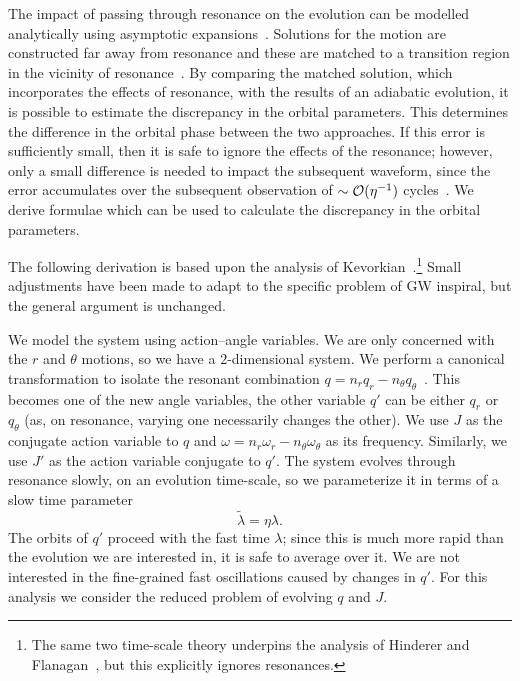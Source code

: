 
The impact of passing through resonance on the evolution can be modelled analytically using asymptotic expansions~\cite{Gair2012}. Solutions for the motion are constructed far away from resonance and these are matched to a transition region in the vicinity of resonance~\cite{Kevorkian1971,Bosley1992}. By comparing the matched solution, which incorporates the effects of resonance, with the results of an adiabatic evolution, it is possible to estimate the discrepancy in the orbital parameters. This determines the difference in the orbital phase between the two approaches. If this error is sufficiently small, then it is safe to ignore the effects of the resonance; however, only a small difference is needed to impact the subsequent waveform, since the error accumulates over the subsequent observation of $\sim \mathcal{O}({\eta^{-1}})$ cycles~\cite{Flanagan2012}. We derive formulae which can be used to calculate the discrepancy in the orbital parameters.

The following derivation is based upon the analysis of Kevorkian~\cite{Kevorkian1987}.\footnote{The same two time-scale theory underpins the analysis of Hinderer and Flanagan~\cite{Hinderer2008}, but this explicitly ignores resonances.} Small adjustments have been made to adapt to the specific problem of GW inspiral, but the general argument is unchanged.

We model the system using action--angle variables. We are only concerned with the $r$ and $\theta$ motions, so we have a $2$-dimensional system. We perform a canonical transformation  to isolate the resonant combination $q = n_r q_r - n_\theta q_\theta$~\cite{Bosley1992}. This becomes one of the new angle variables, the other variable $q'$ can be either $q_r$ or $q_\theta$ (as, on resonance, varying one necessarily changes the other). We use $J$ as the conjugate action variable to $q$ and $\omega = n_r \omega_r - n_\theta \omega_\theta$ as its frequency. Similarly, we use $J'$ as the action variable conjugate to $q'$. The system evolves through resonance slowly, on an evolution time-scale, so we parameterize it in terms of a slow time parameter
\begin{equation}
\widetilde{\lambda} = \eta\lambda.
\end{equation}
The orbits of $q'$ proceed with the fast time $\lambda$; since this is much more rapid than the evolution we are interested in, it is safe to average over it. We are not interested in the fine-grained fast oscillations caused by changes in $q'$. For this analysis we consider the reduced problem of evolving $q$ and $J$.

